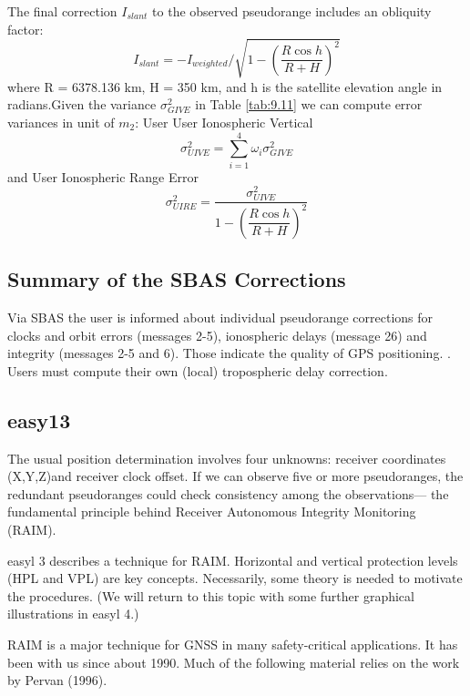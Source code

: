 		The final correction $I_{slant}$ to the observed pseudorange includes an obliquity factor:
		\begin{equation}\label{eq:9.53}
			I_{slant} = -I_{weighted}/\sqrt{1-(\dfrac{R\cos h}{R+H})^2}
		\end{equation}
		where R = 6378.136 km, H = 350 km, and h is the satellite elevation angle in radians.Given the variance $\sigma^2_{GIVE}$ in Table \ref{tab:9.11} we can compute error variances in unit of $m_2$:
		User User Ionospheric Vertical 
		\begin{equation}\label{eq:9.54}
			\sigma^2_{UIVE}=\sum^4_{i=1}\omega_i\sigma^2_{GIVE}
		\end{equation}
		and User Ionospheric Range Error
		\begin{equation}\label{eq:9.55}
			\sigma^2_{UIRE}=\dfrac{\sigma^2_{UIVE}}{1-(\dfrac{R\cos h}{R+H})^2}
		\end{equation} 
	
	\subsection{Summary of the SBAS Corrections}
		Via SBAS the user is informed about individual pseudorange corrections for clocks and orbit errors (messages 2-5), ionospheric delays (message 26) and integrity (messages 2-5 and 6). Those indicate the quality of GPS positioning. . Users must compute their own (local) tropospheric delay correction.
	
	\subsection{easy13}\label{subsec:easy13}
		The usual position determination involves four unknowns: receiver coordinates (X,Y,Z)and receiver clock offset. If we can observe five or more pseudoranges, the redundant pseudoranges could check consistency among the observations— the fundamental principle behind Receiver Autonomous Integrity Monitoring (RAIM).
		
		easyl 3 describes a technique for RAIM. Horizontal and vertical protection levels (HPL and VPL) are key concepts. Necessarily, some theory is needed to motivate the procedures. (We will return to this topic with some further graphical illustrations in easyl 4.)
		
		RAIM is a major technique for GNSS in many safety-critical applications. It has been with us since about 1990. Much of the following material relies on the work by Pervan (1996).
		
